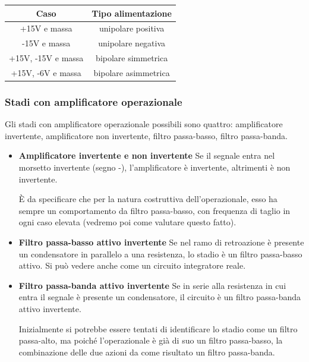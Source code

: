 \documentclass[a4paper,twocolumn,notitlepage]{book}
\begin{document}
		\begin{tabular}{|c|c|}
		\hline
		\textbf{Caso} & \textbf{Tipo alimentazione} \\
		\hline
		+15V e massa & unipolare positiva \\
		-15V e massa & unipolare negativa \\
		+15V, -15V e massa & bipolare simmetrica \\
		+15V, -6V e massa & bipolare asimmetrica \\
		\hline
		\end{tabular}
		
		\subsubsection*{Stadi con amplificatore operazionale}
		Gli stadi con amplificatore operazionale possibili sono quattro: amplificatore invertente, amplificatore non invertente, filtro passa-basso, filtro passa-banda.
		\begin{itemize}
			\item \textbf{Amplificatore invertente e non invertente}\newline
				Se il segnale entra nel morsetto invertente (segno -), l'amplificatore è invertente, altrimenti è non invertente.
				
				È da specificare che per la natura costruttiva dell'operazionale, esso ha sempre un comportamento da filtro passa-basso, con frequenza di taglio in ogni caso elevata (vedremo poi come valutare questo fatto).
			\item \textbf{Filtro passa-basso attivo invertente}\newline
			Se nel ramo di retroazione è presente un condensatore in parallelo a una resistenza, lo stadio è un filtro passa-basso attivo.
			Si può vedere anche come un circuito integratore reale.
			
			\item \textbf{Filtro passa-banda attivo invertente}\newline
			Se in serie alla resistenza in cui entra il segnale è presente un condensatore, il circuito è un filtro passa-banda attivo invertente.
			
			Inizialmente si potrebbe essere tentati di identificare lo stadio come un filtro passa-alto, ma poiché l'operazionale è già di suo un filtro passa-basso, la combinazione delle due azioni da come risultato un filtro passa-banda.
		\end{itemize}
		
\end{document}
